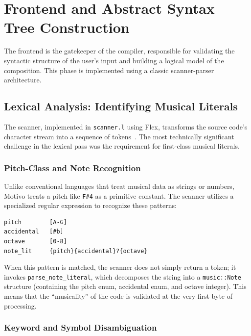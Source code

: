 \section{Frontend and Abstract Syntax Tree Construction}\label{sec:implementation-frontend}

The frontend is the gatekeeper of the compiler, responsible for validating the syntactic structure of the user's input
and building a logical model of the composition.
This phase is implemented using a classic scanner-parser architecture.

\subsection{Lexical Analysis: Identifying Musical
Literals}\label{detail-subsec:lexical-analysis:-identifying-musical-literals}

The scanner, implemented in \texttt{scanner.l} using Flex, transforms the source code's character stream into a sequence
of tokens~\cite{Flex_2026}.
The most technically significant challenge in the lexical pass was the requirement for first-class musical literals.

\subsubsection{Pitch-Class and Note Recognition}

Unlike conventional languages that treat musical data as strings or numbers, Motivo treats a pitch like
\texttt{F\#4} as
a primitive constant.
The scanner utilizes a specialized regular expression to recognize these patterns:
\begin{lstlisting}[caption={Flex regular expression for note literal recognition.},label={detail-lst:lstlisting}]
pitch        [A-G]
accidental   [#b]
octave       [0-8]
note_lit     {pitch}{accidental}?{octave}
\end{lstlisting}

When this pattern is matched, the scanner does not simply return a token; it invokes
\texttt{parse\_note\_literal}, which
decomposes the string into a \texttt{music::Note} structure (containing the pitch enum, accidental enum, and octave
integer).
This means that the ``musicality'' of the code is validated at the very first byte of processing.

\subsubsection{Keyword and Symbol Disambiguation}

